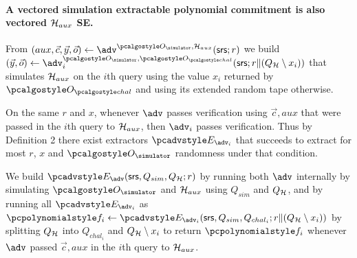 \documentclass[runningheads,11pt]{llncs}
\let\spvec\vec \let\vec\accentvec
\let\vec\spvec
\begin{document}
\paragraph{A vectored simulation extractable polynomial commitment is also vectored $\mathcal{H}_{aux}$ SE.}
From $(aux, \vec{c}, \vec{y}, \vec{o}) \gets \adv^{\oracles,\ro_{aux}}(\srs; r)$ we build $(\vec{y},\vec{o}) \gets \adv_{i}^{\oracles,\oraclec}(\srs; r\|(Q_{\ro}\setminus x_{i}))$ that simulates $\mathcal{H}_{aux}$ on the $i$th query using the value $x_{i}$ returned by $\oraclec$ and using its extended random tape otherwise.

On the same $r$ and $x$, whenever $\adv$ passes verification using $\vec{c},aux$ that were passed in the $i$th query to $\mathcal{H}_{aux}$, then $\adv_{i}$ passes verification.  Thus by Definition 2 there exist extractors $\Ext_{\adv_{i}}$ that succeeds to extract for most $r$, $x$ and $\oracles$ randomness under that condition.

We build $\Ext_{\adv}(\srs, Q_{sim}, Q_{\ro}; r)$ by running both $\adv$
internally by simulating $\oracles$ and $\mathcal{H}_{aux}$ using $Q_{sim}$ and
$Q_{\mathcal{H}}$, and by running all $\Ext_{\adv_{i}}$ as $\p{f}_{i}\gets
\Ext_{\adv_{i}}(\srs,Q_{sim},Q_{chal_{i}}; r\|(Q_{\ro}\setminus x_{i}))$ by
splitting $Q_{\mathcal{H}}$ into $Q_{chal_{i}}$ and $Q_{\mathcal{H}}\setminus x_{i}$ to return
$\p{f}_{i}$ whenever $\adv$ passed $\vec{c},aux$ in the $i$th query to
$\mathcal{H}_{aux}$.
\end{document}
